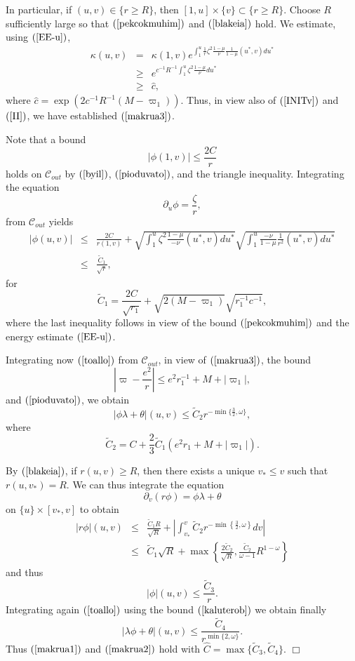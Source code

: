 \documentclass{article}
\begin{document}
\noindent
In particular, if $(u,v)\in\{r\ge R\}$, then 
$[1,u]\times\{v\}\subset\{r\ge R\}$. Choose $R$ sufficiently large
so that $(\ref{pekcokmuhim})$ and $(\ref{blakeia})$ hold.
We estimate, using $(\ref{EE-u})$,
\begin{eqnarray*}
\kappa(u,v)	& = &	\kappa(1,v)e^
								{\int_1^u{\frac1r\zeta^2\frac{1-\mu}\nu
								\frac{1}{1-\mu}(u^*,v)du^*}}\\
					&\ge&	e^{c^{-1}R^{-1}
								\int_1^u{\zeta^2
								\frac{1-\mu}{\nu} du^*}}\\
					&\ge&	\hat{c},
\end{eqnarray*}	
where $\hat{c}=\exp\left(2c^{-1}R^{-1}(M-\varpi_1)\right)$.
Thus, in view also of $(\ref{INITv})$ and $(\ref{II})$, we 
have established $(\ref{makrua3})$.

Note that a bound
\[
|\phi(1,v)|\le\frac{2C}r
\]
holds on $\mathcal{C}_{out}$ 
by $(\ref{byil})$, $(\ref{pioduvato})$, and the triangle inequality.
Integrating the equation
\[
\partial_u\phi=\frac{\zeta}r,
\]
from $\mathcal{C}_{out}$
yields
\begin{eqnarray*}
|\phi(u,v)|	&\le&	\frac{2C}{r(1,v)}+
					\sqrt{\int_1^u\zeta^2\frac{1-\mu}{-\nu}
					(u^*,v)du^*}
					\sqrt{\int_1^u\frac{-\nu}
					{1-\mu}\frac{1}{r^2}(u^*,v)du^*}\\
		&\le&	\frac{\tilde{C}_1}{\sqrt{r}},
\end{eqnarray*}
for
\[
\tilde{C}_1=\frac{2C}{\sqrt{r_1}}+\sqrt{2(M-\varpi_1)}\sqrt{r_1^{-1}c^{-1}},
\]
where the last inequality follows in view of the bound $(\ref{pekcokmuhim})$
and the energy estimate $(\ref{EE-u})$.

Integrating now
$(\ref{toallo})$
from $\mathcal{C}_{out}$, in view of $(\ref{makrua3})$, the bound
\begin{equation}
\label{all1ast}
\left|\varpi-\frac{e^2}r\right|\le e^2r_1^{-1}+M+|\varpi_1|,
\end{equation}
and
$(\ref{pioduvato})$,
we obtain
\[
|\phi\lambda+\theta|(u,v)\le \tilde{C}_2r^{-\min\{\frac32,\omega\}},
\]
where
\[
\tilde{C}_2=C+\frac{2}3\tilde{C}_1(e^2r_1+M+|\varpi_1|).
\]

By $(\ref{blakeia})$, if $r(u,v)\ge R$, then
there exists a unique $v_*\le v$ such that $r(u,v_*)=R$. 
We can thus integrate the equation
\[
\partial_v(r\phi)=\phi\lambda+\theta
\]
on $\{u\}\times[v_*,v]$
 to obtain
\begin{eqnarray*}
|r\phi|(u,v)	&\le&	\frac{\tilde{C}_1R}{\sqrt R}+
\left|\int_{v_*}^v{{\tilde{C}_2}r^{-\min\left\{\frac32,\omega\right\}}dv}\right|\\
		&\le&	\tilde{C}_1\sqrt{R}+\max\left\{\frac{2\tilde{C}_2}{\sqrt{R}},
				\frac{\tilde{C}_2}{\omega-1}R^{1-\omega}\right\}
\end{eqnarray*}
and thus
\begin{equation}
\label{kaluterob}
|\phi|(u,v)\le\frac {\tilde{C}_3}r.
\end{equation}
Integrating again $(\ref{toallo})$
using the bound $(\ref{kaluterob})$ we obtain finally
\[
|\lambda\phi+\theta|(u,v)\le\frac{\tilde{C}_4}{r^{\min\{2,\omega\}}}.
\]
Thus $(\ref{makrua1})$ and $(\ref{makrua2})$ hold with 
$\hat{C}=\max\{\tilde{C}_3,\tilde{C}_4\}$.
$\Box$
\end{document}
